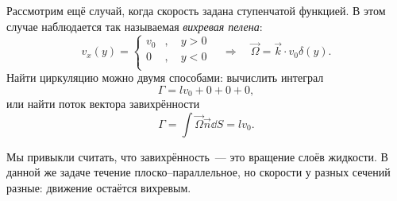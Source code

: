  Рассмотрим ещё случай, когда скорость задана ступенчатой функцией. В этом случае наблюдается так называемая \textit{вихревая пелена}:
\begin{equation}
	v_x(y)=\left\{
	\begin{aligned}
		v_0&, \quad y>0\\
		0&, \quad y<0\\
	\end{aligned}
	\right.
	\quad\Rightarrow\quad
	\vec{\Omega}=\vec{k}\cdot v_0\delta(y).
\end{equation}
Найти циркуляцию можно двумя способами: вычислить интеграл
\begin{equation}
	\Gamma=lv_0+0+0+0,
\end{equation}
или найти поток вектора завихрённости
\begin{equation}
	\Gamma=\int \vec{\Omega}\vec{n}\dd S = lv_0.
\end{equation}

Мы привыкли считать, что завихрённость~--- это вращение слоёв жидкости. В данной же задаче течение плоско--параллельное, но скорости у разных сечений разные: движение остаётся вихревым.

